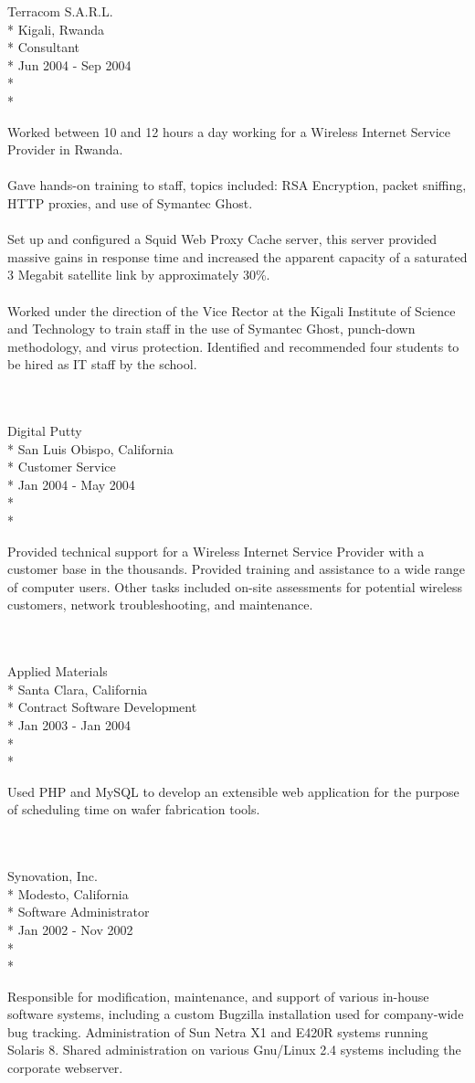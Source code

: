 \documentclass[10pt]{article}
\newcommand{\work}[5]{ 
#1\\*
#3\\*
#4\\*
#2\\*
\\*
\makebox[1.25in][l]{}
\begin{minipage}[t]{5.00in}\small{#5}\end{minipage}
\\
\\
}
\begin{document}
\work{Terracom S.A.R.L.}{Jun 2004 - Sep 2004}{Kigali, Rwanda}{Consultant}{
Worked between 10 and 12 hours a day working for a Wireless Internet Service Provider in Rwanda.
\\
\\
Gave hands-on training to staff, topics included: RSA Encryption, packet sniffing, HTTP proxies, and use of Symantec Ghost.
\\
\\
Set up and configured a Squid Web Proxy Cache server, 
this server provided massive gains in response time and increased the apparent capacity of a saturated 3 Megabit satellite link by approximately 30\%.
\\
\\
Worked under the direction of the Vice Rector at the Kigali Institute of Science and Technology to train staff 
in the use of Symantec Ghost, punch-down methodology, and virus protection. 
Identified and recommended four students to be hired as IT staff by the school.
}

\work{Digital Putty}{Jan 2004 - May 2004}{San Luis Obispo, California}{Customer Service}{
Provided technical support for a Wireless Internet Service Provider with a customer base in the thousands. 
Provided training and assistance to a wide range of computer users. 
Other tasks included on-site assessments for potential wireless customers, network troubleshooting, and maintenance.
}

\work{Applied Materials}{Jan 2003 - Jan 2004}{Santa Clara, California}{Contract Software Development}{
Used PHP and MySQL to develop an extensible web application for the purpose of scheduling time on wafer fabrication tools.
}


\work{Synovation, Inc.}{Jan 2002 - Nov 2002}{Modesto, California}{Software Administrator}{
Responsible for modification, maintenance, and support of various in-house software systems, 
including a custom Bugzilla installation used for company-wide bug tracking. 
Administration of Sun Netra X1 and E420R systems running Solaris 8. 
Shared administration on various Gnu/Linux 2.4 systems including the corporate webserver.
}
\end{document}
